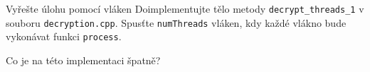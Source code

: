 \documentclass[usenames,dvipsnames,9pt]{beamer}
\begin{document}


  

  



    

{
\begin{frame}[fragile]
  \begin{block}{Vyřešte úlohu pomocí vláken}
    Doimplementujte tělo metody \texttt{decrypt\_threads\_1} v souboru \texttt{decryption.cpp}.
    Spusťte \texttt{numThreads} vláken, kdy každé vlákno bude vykonávat funkci \texttt{process}.
  \end{block}

  \pause

  \vspace{2em}
  \begin{center}
    \Large
    Co je na této implementaci špatně?
  \end{center}
\end{frame}
}
\end{document}
